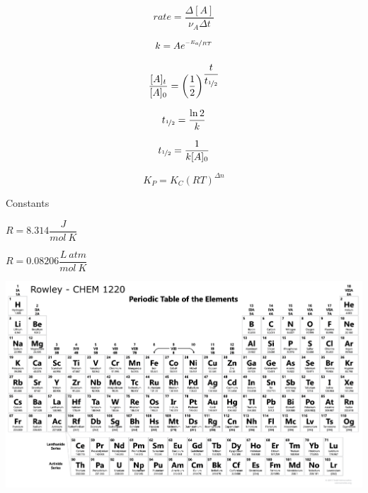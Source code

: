 \documentclass[12pt, letterpaper]{memoir}
\begin{document}
  \begin{minipage}[c][\stretch{1}][c]{0.5\linewidth}
    \begin{equation*}
      rate=\dfrac{\Delta[A]}{\nu_A\Delta t}
    \end{equation*}

    \begin{equation*}
      k=Ae^{\nicefrac{-E_a}{RT}}
    \end{equation*}

    \begin{equation*}
      \dfrac{[A]_t}{[A]_0}=\left(\dfrac{1}{2}\right)^{\dfrac{t}{t_{\nicefrac{1}{2}}}}
    \end{equation*}

    \begin{equation*}
      t_{\nicefrac{1}{2}}=\dfrac{\ln{2}}{k}
    \end{equation*}

    \begin{equation*}
      t_{\nicefrac{1}{2}} = \dfrac{1}{k[A]_0}
    \end{equation*}

    \begin{equation*}
      K_P=K_C\left(RT\right)^{\Delta n}
    \end{equation*}
  \end{minipage}

	
  \begin{center}
	{\large Constants}

  \hrulefill
  \end{center}
	
  \begin{minipage}[c]{0.495\linewidth}
	$R=8.314 \dfrac{J}{mol~K}$
  \end{minipage}	
  \begin{minipage}[c]{0.495\linewidth}
	$R=0.08206 \dfrac{L~atm}{mol~K}$
  \end{minipage}	
	
	

  \hspace{6em}	\includegraphics[width=1.3\textwidth, angle =90]{UpdatedTable}
\end{document}
